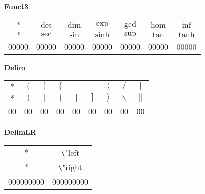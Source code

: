 \documentclass[12pt]{report}
\newlength{\mine}
\newlength{\niz}
\def\pmb{}
\begin{document}
\textbf{Funct3}
\par\nobreak\vspace{2mm}
\begin{tabular}{|c|cccccc|}
  \hline
   $\pmb *      $&
   $\pmb\det    $&
   $\pmb\dim    $&
   $\pmb\exp    $&
   $\pmb\gcd    $&
   $\pmb\hom    $&
   $\pmb\inf    $\\[\mine]
   $\pmb *      $&
   $\pmb\sec    $&
   $\pmb\sin    $&
   $\pmb\sinh   $&
   $\pmb\sup    $&
   $\pmb\tan    $&
   $\pmb\tanh   $\\[\niz]
  \hline\hline
  00000&00000&00000&00000&00000&00000&00000\\
  \hline
\end{tabular}
\goodbreak\par\vspace{3mm}

\newpage

\textbf{Delim}
\par\nobreak\vspace{2mm}
\begin{tabular}{|c|cccccccc|}
  \hline
   $\pmb *             $&
   $\pmb (             $&
   $\pmb [             $&
   $\pmb\{             $&
   $\pmb\lfloor        $&
   $\pmb\lceil         $&
   $\pmb\langle        $&
   $\pmb /             $&
   $\pmb |             $\\[\mine]
   $\pmb *             $&
   $\pmb )             $&
   $\pmb ]             $&
   $\pmb\}             $&
   $\pmb\rfloor        $&
   $\pmb\rceil         $&
   $\pmb\rangle        $&
   $\pmb\backslash     $&
   $\pmb\|             $\\[\niz]
  \hline\hline
  00&00&00&00&00&00&00&00&00\\
  \hline
\end{tabular}
\goodbreak\par\vspace{3mm}

\textbf{DelimLR}
\par\nobreak\vspace{2mm}
\begin{tabular}{|c|c|}
  \hline
   $\pmb *         $&
   \small\verb"\"$\mathrm{left}$\\[\mine]
   $\pmb *         $&
   \small\verb"\"$\mathrm{right}$\\[\niz]
  \hline\hline
  000000000&000000000\\
  \hline
\end{tabular}
\goodbreak\par\vspace{3mm}
\end{document}
